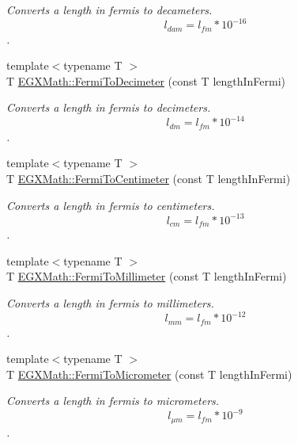 \begin{DoxyCompactItemize}
\begin{DoxyCompactList}\small\item\em Converts a length in fermis to decameters. \[ l_{dam}=l_{fm} * 10^{-16} \]. \end{DoxyCompactList}\item 
{\footnotesize template$<$typename T $>$ }\\T \mbox{\hyperlink{group___e_g_x_math-_conversions-_length_conversions-_non-_s_i-_fermi-_s_i_ga2cfa1fa15a1113ea5eb214a6954240a9}{E\+G\+X\+Math\+::\+Fermi\+To\+Decimeter}} (const T length\+In\+Fermi)
\begin{DoxyCompactList}\small\item\em Converts a length in fermis to decimeters. \[ l_{dm}=l_{fm} * 10^{-14} \]. \end{DoxyCompactList}\item 
{\footnotesize template$<$typename T $>$ }\\T \mbox{\hyperlink{group___e_g_x_math-_conversions-_length_conversions-_non-_s_i-_fermi-_s_i_ga3de937db3dd4286efef9b68128eae2ad}{E\+G\+X\+Math\+::\+Fermi\+To\+Centimeter}} (const T length\+In\+Fermi)
\begin{DoxyCompactList}\small\item\em Converts a length in fermis to centimeters. \[ l_{cm}=l_{fm} * 10^{-13} \]. \end{DoxyCompactList}\item 
{\footnotesize template$<$typename T $>$ }\\T \mbox{\hyperlink{group___e_g_x_math-_conversions-_length_conversions-_non-_s_i-_fermi-_s_i_ga189607f0f4e5661cc0e77f93ac5be3f1}{E\+G\+X\+Math\+::\+Fermi\+To\+Millimeter}} (const T length\+In\+Fermi)
\begin{DoxyCompactList}\small\item\em Converts a length in fermis to millimeters. \[ l_{mm}=l_{fm} * 10^{-12} \]. \end{DoxyCompactList}\item 
{\footnotesize template$<$typename T $>$ }\\T \mbox{\hyperlink{group___e_g_x_math-_conversions-_length_conversions-_non-_s_i-_fermi-_s_i_ga3e8b4a4bff215efda3d05329d6a823db}{E\+G\+X\+Math\+::\+Fermi\+To\+Micrometer}} (const T length\+In\+Fermi)
\begin{DoxyCompactList}\small\item\em Converts a length in fermis to micrometers. \[ l_{\mu m}=l_{fm} * 10^{-9} \]. \end{DoxyCompactList}\item 

\end{DoxyCompactItemize}
